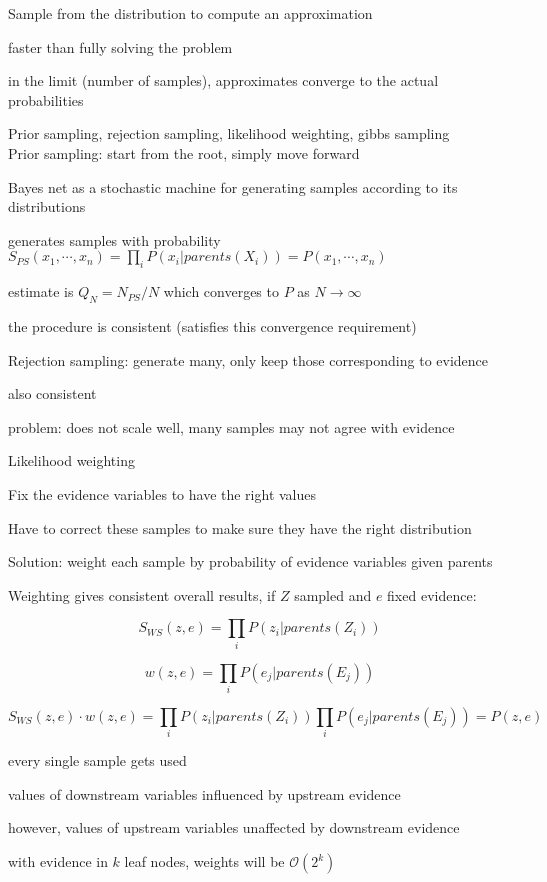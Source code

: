 \documentclass[12pt]{article}
\begin{document}
\noindent
Sample from the distribution to compute an approximation

faster than fully solving the problem

in the limit (number of samples), approximates converge to the actual probabilities

\noindent
Prior sampling, rejection sampling, likelihood weighting, gibbs sampling\\

\noindent
Prior sampling: start from the root, simply move forward

Bayes net as a stochastic machine for generating samples according to its distributions

generates samples with probability $S_{PS}(x_1, \cdots, x_n) = \prod_i P(x_i| parents(X_i)) = P(x_1, \cdots, x_n)$

estimate is $Q_N = N_{PS}/N$ which converges to $P$ as $N \to \infty$

the procedure is consistent (satisfies this convergence requirement)

\noindent
Rejection sampling: generate many, only keep those corresponding to evidence

also consistent

problem: does not scale well, many samples may not agree with evidence

\noindent
Likelihood weighting

Fix the evidence variables to have the right values

Have to correct these samples to make sure they have the right distribution

Solution: weight each sample by probability of evidence variables given parents

Weighting gives consistent overall results, if $Z$ sampled and $e$ fixed evidence:

$$S_{WS}(z, e) = \prod_i P(z_i | parents(Z_i))$$

$$w(z, e) = \prod_i P(e_j | parents(E_j))$$

$$S_{WS}(z, e) \cdot w(z, e) = \prod_i P(z_i | parents(Z_i)) \prod_i P(e_j | parents(E_j)) = P(z, e)$$

every single sample gets used

values of downstream variables influenced by upstream evidence

however, values of upstream variables unaffected by downstream evidence

with evidence in $k$ leaf nodes, weights will be $\mathcal{O}(2^k)$
\end{document}
